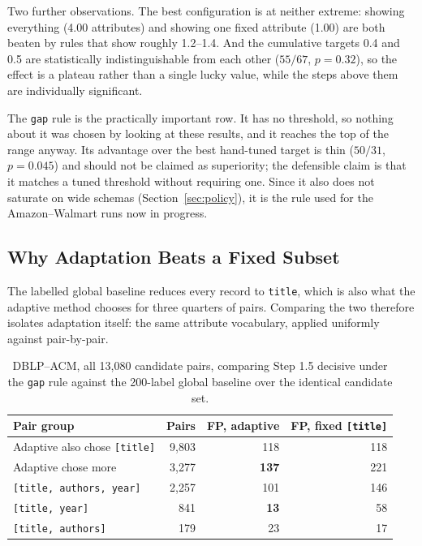 \documentclass[11pt]{article}
\begin{document}
Two further observations. The best configuration is at neither extreme: showing everything
(4.00 attributes) and showing one fixed attribute (1.00) are both beaten by rules that show
roughly 1.2--1.4. And the cumulative targets 0.4 and 0.5 are statistically indistinguishable
from each other ($55/67$, $p = 0.32$), so the effect is a plateau rather than a single lucky
value, while the steps above them are individually significant.

The \texttt{gap} rule is the practically important row. It has no threshold, so nothing about
it was chosen by looking at these results, and it reaches the top of the range anyway. Its
advantage over the best hand-tuned target is thin ($50/31$, $p = 0.045$) and should not be
claimed as superiority; the defensible claim is that it matches a tuned threshold without
requiring one. Since it also does not saturate on wide schemas
(Section~\ref{sec:policy}), it is the rule used for the Amazon--Walmart runs now in progress.

\subsection{Why Adaptation Beats a Fixed Subset}
\label{sec:mechanism}

The labelled global baseline reduces every record to \texttt{title}, which is also what the
adaptive method chooses for three quarters of pairs. Comparing the two therefore isolates
adaptation itself: the same attribute vocabulary, applied uniformly against
pair-by-pair.

\begin{table}[h]
\centering
\begin{tabular}{lrrr}
\toprule
Pair group & Pairs & FP, adaptive & FP, fixed \texttt{[title]} \\
\midrule
Adaptive also chose \texttt{[title]} & 9{,}803 & 118 & 118 \\
Adaptive chose more                  & 3{,}277 & \textbf{137} & 221 \\
\midrule
\quad \texttt{[title, authors, year]} & 2{,}257 & 101 & 146 \\
\quad \texttt{[title, year]}          &    841 &  \textbf{13} &  58 \\
\quad \texttt{[title, authors]}       &    179 &  23 &  17 \\
\bottomrule
\end{tabular}
\caption{DBLP--ACM, all 13{,}080 candidate pairs, comparing Step 1.5 decisive under the
\texttt{gap} rule against the 200-label global baseline over the identical candidate set.}
\end{table}
\end{document}
